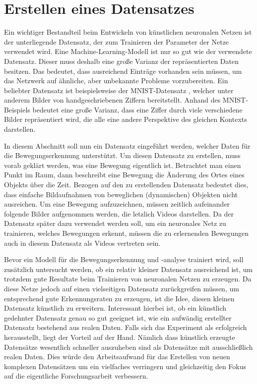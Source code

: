 \chapter{Erstellen eines Datensatzes}\label{chapter:dataset}
Ein wichtiger Bestandteil beim Entwickeln von künstlichen neuronalen Netzen ist
der unterliegende Datensatz, der zum Trainieren der Parameter der Netze
verwendet wird. Eine Machine-Learning-Modell ist nur so gut wie der verwendete
Datensatz. Dieser muss deshalb eine große Varianz der repräsentierten Daten
besitzen. Das bedeutet, dass ausreichend Einträge vorhanden sein müssen, um das
Netzwerk auf ähnliche, aber unbekannte Probleme vorzubereiten. Ein beliebter
Datensatz ist beispielsweise der MNIST-Datensatz \cite{6296535}, welcher unter
anderem Bilder von handgeschriebenen Ziffern bereitstellt. Anhand des
MNIST-Beispiels bedeutet eine große Varianz, dass eine Ziffer durch viele
verschiedene Bilder repräsentiert wird, die alle eine andere Perspektive des
gleichen Kontexts darstellen.

In diesem Abschnitt soll nun ein Datensatz eingeführt werden, welcher Daten für
die Bewegungserkennung unterstützt. Um diesen Datensatz zu erstellen, muss vorab
geklärt werden, was eine Bewegung eigentlich ist. Betrachtet man einen Punkt im
Raum, dann beschreibt eine Bewegung die Änderung des Ortes eines Objekts über
die Zeit. Bezogen auf den zu erstellenden Datensatz bedeutet dies, dass einfache
Bildaufnahmen von beweglichen (dynamischen) Objekten nicht ausreichen. Um eine
Bewegung aufzuzeichnen, müssen zeitlich aufeinander folgende Bilder aufgenommen
werden, die letzlich Videos darstellen. Da der Datensatz später dazu verwendet
werden soll, um ein neuronales Netz zu trainieren, welches Bewegungen erkennt,
müssen die zu erlernenden Bewegungen auch in diesem Datensatz als Videos
vertreten sein.

Bevor ein Modell für die Bewegungserkennung und -analyse trainiert wird, soll
zusätzlich untersucht werden, ob ein relativ kleiner Datensatz ausreichend ist,
um trotzdem gute Resultate beim Trainieren von neuronalen Netzen zu erzeugen. Da
diese Netze jedoch auf einen vielseitigen Datensatz zurückgreifen müssen, um
entsprechend gute Erkennungsraten zu erzeugen, ist die Idee, diesen kleinen
Datensatz künstlich zu erweitern. Interessant hierbei ist, ob ein künstlich
gedehnter Datensatz genau so gut geeignet ist, wie ein aufwändig erstellter
Datensatz bestehend aus realen Daten. Falls sich das Experiment als erfolgreich
herausstellt, liegt der Vorteil auf der Hand. Nämlich dass künstlich erzeugte
Datensätze wesentlich schneller auszuheben sind als Datensätze mit
ausschließlich realen Daten. Dies würde den Arbeitsaufwand für das Erstellen von
neuen komplexen Datensätzen um ein vielfaches verringern und gleichzeitig den
Fokus auf die eigentliche Forschungsarbeit verbessern.


